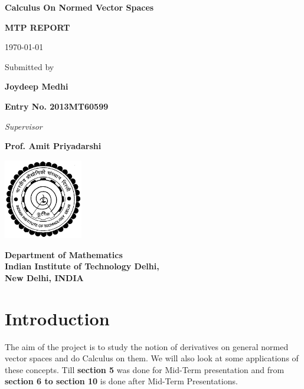 \documentclass[12 pt]{article}
\theoremstyle{definition}
\theoremstyle{remark}
\newcommand\blankpage{%
    \null
    \thispagestyle{empty}%
    \addtocounter{page}{-1}%
    \newpage}
\begin{document}
\begin{center}
\begin{LARGE}
\textbf {Calculus On Normed Vector Spaces}
\end{LARGE}
\begin{center}
\end{center}
{\begin{Large}
\textbf{MTP REPORT} \\
\end{Large}}
\today
\end{center}

\vspace{45mm}
\begin{center}
Submitted by


\textbf{Joydeep Medhi}

\bf Entry No. 2013MT60599
\vspace{15mm}

\textit{Supervisor}

\textbf{Prof. Amit Priyadarshi}

\end{center}
\vspace{2cm}
\begin{center}
\includegraphics[height=3.5cm]{iitlogo.jpg}
\end{center}
\begin{center}
\textbf{{Department of Mathematics\\
Indian Institute of Technology Delhi,\\
New Delhi, INDIA}}
\end{center}
\thispagestyle{empty}
\thispagestyle{empty}



\section{Introduction}

The aim of the project is to study the notion of derivatives on general normed vector spaces and do Calculus on them. We will also look at some applications of these concepts.
Till \textbf{section 5} was done for Mid-Term presentation and from \textbf{section 6 to section 10} is done after Mid-Term Presentations.
\end{document}

